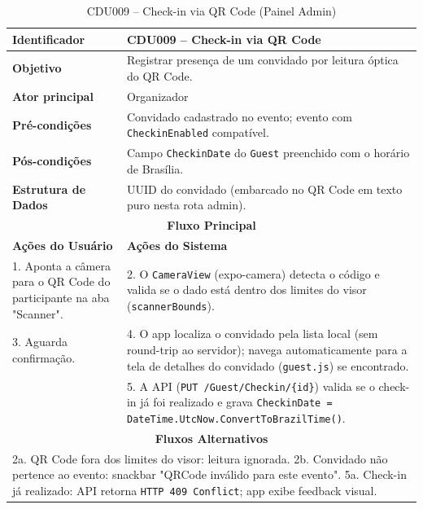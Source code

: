 \begin{table}[htbp]
\centering
\caption{CDU009 – Check-in via QR Code (Painel Admin)}
\begin{tabular}{|p{4cm}|p{11cm}|}
\hline
\textbf{Identificador} & CDU009 – Check-in via QR Code \\ \hline
\textbf{Objetivo} & Registrar presença de um convidado por leitura óptica do QR Code. \\ \hline
\textbf{Ator principal} & Organizador \\ \hline
\textbf{Pré-condições} & Convidado cadastrado no evento; evento com \texttt{CheckinEnabled} compatível. \\ \hline
\textbf{Pós-condições} & Campo \texttt{CheckinDate} do \texttt{Guest} preenchido com o horário de Brasília. \\ \hline
\textbf{Estrutura de Dados} & UUID do convidado (embarcado no QR Code em texto puro nesta rota admin). \\ \hline
\multicolumn{2}{|c|}{\textbf{Fluxo Principal}} \\ \hline
\textbf{Ações do Usuário} & \textbf{Ações do Sistema} \\ \hline
1. Aponta a câmera para o QR Code do participante na aba "Scanner". & 2. O \texttt{CameraView} (expo-camera) detecta o código e valida se o dado está dentro dos limites do visor (\texttt{scannerBounds}). \\ \hline
3. Aguarda confirmação. & 4. O app localiza o convidado pela lista local (sem round-trip ao servidor); navega automaticamente para a tela de detalhes do convidado (\texttt{guest.js}) se encontrado. \\ \hline
 & 5. A API (\texttt{PUT /Guest/Checkin/\{id\}}) valida se o check-in já foi realizado e grava \texttt{CheckinDate = DateTime.UtcNow.ConvertToBrazilTime()}. \\ \hline
\multicolumn{2}{|c|}{\textbf{Fluxos Alternativos}} \\ \hline
\multicolumn{2}{|p{15cm}|}{2a. QR Code fora dos limites do visor: leitura ignorada. 2b. Convidado não pertence ao evento: snackbar "QRCode inválido para este evento". 5a. Check-in já realizado: API retorna \texttt{HTTP 409 Conflict}; app exibe feedback visual.} \\ \hline
\end{tabular}
\end{table}

